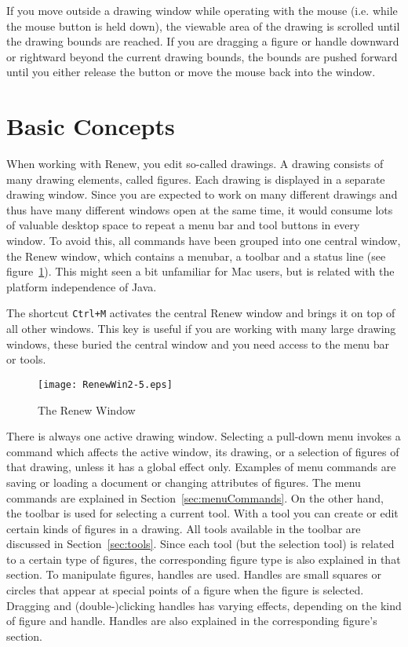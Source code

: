 If you move outside a drawing window while operating with the mouse
(i.e. while the mouse button is held down), the viewable area of the
drawing is scrolled until the drawing bounds are reached.
If you are dragging a figure or handle downward or rightward beyond the
current drawing bounds, the bounds are pushed forward until you either
release the button or move the mouse back into the window.

\section{Basic Concepts}
\label{sec:usageBasics}

When working with Renew, you edit so-called drawings.
A drawing consists of many drawing elements, called figures.
Each drawing is displayed in a separate drawing window.
Since you are expected to work on many different drawings and
thus have many different windows open at the same time, it
would consume lots of valuable desktop space to repeat
a menu bar and tool buttons in every window.
To avoid this, all commands have been grouped into one
central window, the Renew window, which contains a menubar,
a toolbar and a status line (see figure~\ref{fig:renewWindow}).
This might seen a bit unfamiliar for Mac users, but is
related with the platform independence of Java.

The shortcut \texttt{Ctrl+M} activates the central Renew
window and brings it on top of all other windows.
This key is useful if you are working with many large drawing windows,
these buried the central window and you need access to the menu bar or
tools.

\begin{figure}[htbp]
  \centerline{%
    \texttt{[image: RenewWin2-5.eps]}%
    }
  \caption{\label{fig:renewWindow}The Renew Window}
\end{figure}%

There is always one active drawing window.
Selecting a pull-down menu invokes a command which
affects the active window, its drawing, or a selection of
figures of that drawing,
unless it has a global effect only.
Examples of menu commands are saving or loading a document
or changing attributes of figures.
The menu commands are explained in Section~\ref{sec:menuCommands}.
On the other hand, the toolbar is used for selecting a current tool.
With a tool you can create or edit certain kinds of figures in a drawing.
All tools available in the toolbar are discussed in Section~\ref{sec:tools}.
Since each tool (but the selection tool) is related to a certain type
of figures, the corresponding
figure type is also explained in that section.
To manipulate figures, handles are used. Handles are small squares or
circles that appear at special points of a figure when the figure is
selected. Dragging and (double-)clicking handles has varying effects,
depending on the kind of figure and handle.
Handles are also explained in the corresponding figure's section.

